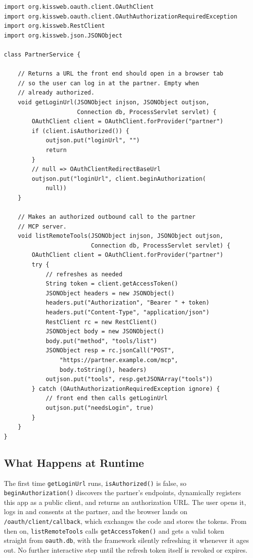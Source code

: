 \begin{lstlisting}[style=groovy,basicstyle=\ttfamily\scriptsize]
import org.kissweb.oauth.client.OAuthClient
import org.kissweb.oauth.client.OAuthAuthorizationRequiredException
import org.kissweb.RestClient
import org.kissweb.json.JSONObject

class PartnerService {

    // Returns a URL the front end should open in a browser tab
    // so the user can log in at the partner. Empty when
    // already authorized.
    void getLoginUrl(JSONObject injson, JSONObject outjson,
                     Connection db, ProcessServlet servlet) {
        OAuthClient client = OAuthClient.forProvider("partner")
        if (client.isAuthorized()) {
            outjson.put("loginUrl", "")
            return
        }
        // null => OAuthClientRedirectBaseUrl
        outjson.put("loginUrl", client.beginAuthorization(
            null))
    }

    // Makes an authorized outbound call to the partner
    // MCP server.
    void listRemoteTools(JSONObject injson, JSONObject outjson,
                         Connection db, ProcessServlet servlet) {
        OAuthClient client = OAuthClient.forProvider("partner")
        try {
            // refreshes as needed
            String token = client.getAccessToken()
            JSONObject headers = new JSONObject()
            headers.put("Authorization", "Bearer " + token)
            headers.put("Content-Type", "application/json")
            RestClient rc = new RestClient()
            JSONObject body = new JSONObject()
            body.put("method", "tools/list")
            JSONObject resp = rc.jsonCall("POST",
                "https://partner.example.com/mcp",
                body.toString(), headers)
            outjson.put("tools", resp.getJSONArray("tools"))
        } catch (OAuthAuthorizationRequiredException ignore) {
            // front end then calls getLoginUrl
            outjson.put("needsLogin", true)
        }
    }
}
\end{lstlisting}

\subsection{What Happens at Runtime}

The first time \texttt{getLoginUrl} runs, \texttt{isAuthorized()} is false, so \texttt{beginAuthorization()} discovers the partner's endpoints, dynamically registers this app as a public client, and returns an authorization URL.  The user opens it, logs in and consents at the partner, and the browser lands on \texttt{/oauth/client/callback}, which exchanges the code and stores the tokens.  From then on, \texttt{listRemoteTools} calls \texttt{getAccessToken()} and gets a valid token straight from \texttt{oauth.db}, with the framework silently refreshing it whenever it ages out.  No further interactive step until the refresh token itself is revoked or expires.

